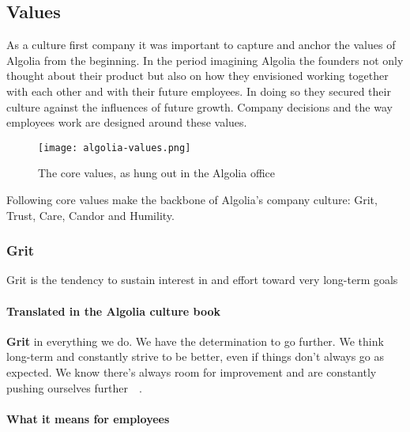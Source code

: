 \subsection{Values}
\label{sub:values}

As a culture first company it was important to capture and anchor the values of Algolia from the beginning. In the period imagining Algolia the founders not only thought about their product but also on how they envisioned working together with each other and with their future employees. In doing so they secured their culture against the influences of future growth. Company decisions and the way employees work are designed around these values.

\begin{figure}[H]
  \centering
  \texttt{[image: algolia-values.png]}
  \caption{The core values, as hung out in the Algolia office\cite{culture-first}}
  \label{figure:values}
\end{figure}

Following core values make the backbone of Algolia's company culture: Grit, Trust, Care, Candor and Humility. 

\subsubsection{Grit}
\label{ssub:grit}

\begin{definition}
Grit is the tendency to sustain interest in and effort toward very long-term goals\cite{grit-ducks}
\end{definition}


\paragraph{Translated in the Algolia culture book}

\textbf{Grit} in everything we do. We have the determination to go further. We think long-term and constantly strive to be better, even if things don’t always go as expected. We know there's always room for improvement and are constantly pushing ourselves further~\cite{algolia-careers}~.

\paragraph{What it means for employees} 

